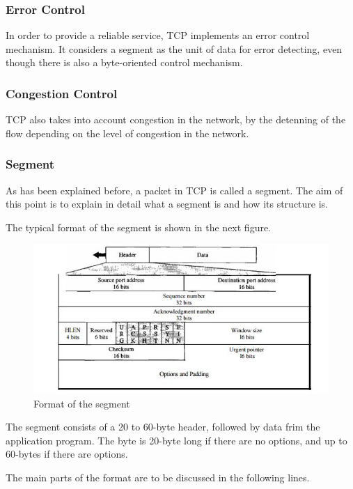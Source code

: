 \subsubsection*{Error Control}
In order to provide a reliable service, TCP implements an error control mechanism. It considers a segment as the unit of data for error detecting, even though there is also a byte-oriented control mechanism. 

\subsubsection*{Congestion Control}
TCP also takes into account congestion in the network, by the detenning of the flow depending on the level of congestion in the network.

\subsubsection*{Segment}
As has been explained before, a packet in TCP is called a segment. The aim of this point is to explain in detail what a segment is and how its structure is.

The typical format of the segment is shown in the next figure. 

\begin{figure}[H]
\begin{center}
\includegraphics[scale=1]{TCP2}
\caption{Format of the segment}
\end{center}
\end{figure}

The segment consists of a 20 to 60-byte header, followed by data frim the application program. The byte is 20-byte long if there are no options, and up to 60-bytes if there are options. 

The main parts of the format are to be discussed in the following lines.

